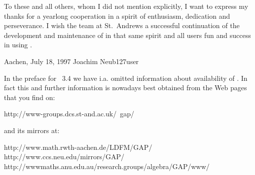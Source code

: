 To these and all others,  whom I did  not  mention explicitly, I want  to
express my  thanks for a yearlong  cooperation in a spirit of enthusiasm,
dedication and perseverance.     I wish   the team  at    St.~Andrews  a
successful continuation  of the development and  maintenance of {\GAP} in
that same spirit and all users fun and success in using {\GAP}.

Aachen, July 18, 1997 \hfill Joachim Neub\accent127user


In   the preface for {\GAP}~3.4  we   have i.a. omitted information about
availability of {\GAP}. In fact this  and further information is nowadays
best obtained from the {\GAP} Web pages that you find on:

\begintt
    http://www-groups.dcs.st-and.ac.uk/~gap/
\endtt

and its mirrors at:

\begintt
    http://www.math.rwth-aachen.de/LDFM/GAP/
    http://www.ccs.neu.edu/mirrors/GAP/
    http://wwwmaths.anu.edu.au/research.groups/algebra/GAP/www/
\endtt

